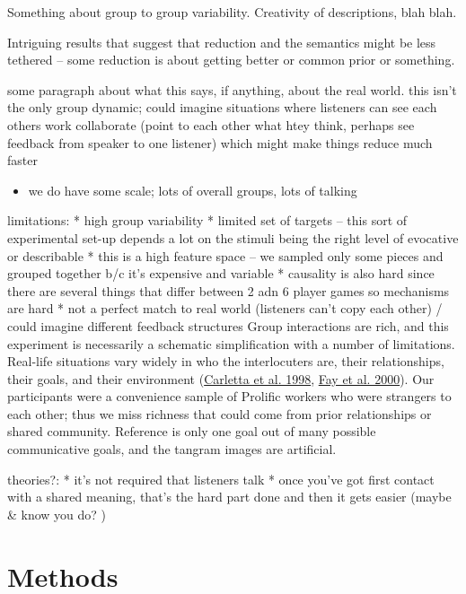 \documentclass[
  english,
  a4paper,
]{article}
\providecommand{\tightlist}{%
  \setlength{\itemsep}{0pt}\setlength{\parskip}{0pt}}
\begin{document}
Something about group to group variability. Creativity of descriptions, blah blah.

Intriguing results that suggest that reduction and the semantics might be less tethered -- some reduction is about getting better or common prior or something.

some paragraph about what this says, if anything, about the real world. this isn't the only group dynamic; could imagine situations where listeners can see each others work collaborate (point to each other what htey think, perhaps see feedback from speaker to one listener) which might make things reduce much faster

\begin{itemize}
\tightlist
\item
  we do have some scale; lots of overall groups, lots of talking
\end{itemize}

limitations:
* high group variability
* limited set of targets -- this sort of experimental set-up depends a lot on the stimuli being the right level of evocative or describable
* this is a high feature space -- we sampled only some pieces and grouped together b/c it's expensive and variable
* causality is also hard since there are several things that differ between 2 adn 6 player games so mechanisms are hard
* not a perfect match to real world (listeners can't copy each other) / could imagine different feedback structures
Group interactions are rich, and this experiment is necessarily a schematic simplification with a number of limitations. Real-life situations vary widely in who the interlocuters are, their relationships, their goals, and their environment (\protect\hyperlink{ref-carletta1998}{Carletta et al. 1998}, \protect\hyperlink{ref-fay2000}{Fay et al. 2000}). Our participants were a convenience sample of Prolific workers who were strangers to each other; thus we miss richness that could come from prior relationships or shared community. Reference is only one goal out of many possible communicative goals, and the tangram images are artificial.

theories?:
* it's not required that listeners talk
* once you've got first contact with a shared meaning, that's the hard part done and then it gets easier (maybe \& know you do? )

\hypertarget{methods}{%
\section{Methods}\label{methods}}
\end{document}
